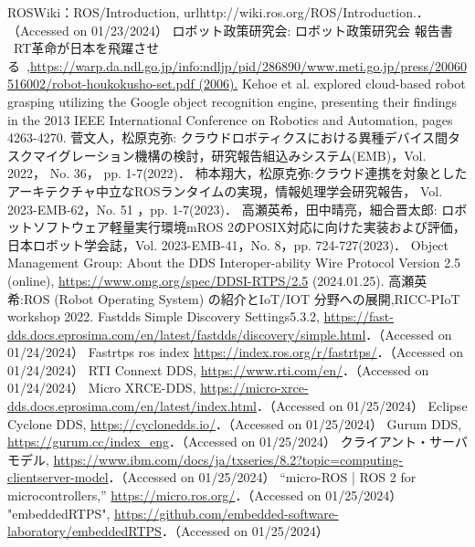 
\begin{thebibliography}{99}
 ROSWiki：ROS/Introduction, url{http://wiki.ros.org/ROS/Introduction.}．（Accessed on 01/23/2024）
 ロボット政策研究会: ロボット政策研究会 報告書 ~RT革命が日本を飛躍させる~,\url{https://warp.da.ndl.go.jp/info:ndljp/pid/286890/www.meti.go.jp/press/20060516002/robot-houkokusho-set.pdf (2006).}
 Kehoe et al. explored cloud-based robot grasping utilizing the Google object recognition engine, presenting their findings in the 2013 IEEE International Conference on Robotics and Automation, pages 4263-4270.
 菅文人，松原克弥: クラウドロボティクスにおける異種デバイス間タスクマイグレーション機構の検討，研究報告組込みシステム(EMB)，Vol. 2022， No. 36， pp. 1-7(2022)．
 柿本翔大，松原克弥:クラウド連携を対象としたアーキテクチャ中立なROSランタイムの実現，情報処理学会研究報告， Vol. 2023-EMB-62，No. 51 ，pp. 1-7(2023)．
 高瀬英希，田中晴亮，細合晋太郎: ロボットソフトウェア軽量実行環境mROS 2のPOSIX対応に向けた実装および評価，日本ロボット学会誌，Vol. 2023-EMB-41，No. 8，pp. 724-727(2023)．
 Object Management Group: About the DDS Interoper-ability Wire Protocol Version 2.5 (online), \url{https://www.omg.org/spec/DDSI-RTPS/2.5} (2024.01.25).
 高瀬英希:ROS (Robot Operating System) の紹介とIoT/IOT 分野への展開,RICC-PIoT workshop 2022.
 Fastdds Simple Discovery Settings5.3.2, \url{https://fast-dds.docs.eprosima.com/en/latest/fastdds/discovery/simple.html}．（Accessed on 01/24/2024）
 Fastrtps ros index \url{https://index.ros.org/r/fastrtps/}．（Accessed on 01/24/2024）
 RTI Connext DDS, \url{https://www.rti.com/en/}．（Accessed on 01/24/2024）
Micro XRCE-DDS, \url{https://micro-xrce-dds.docs.eprosima.com/en/latest/index.html}．（Accessed on 01/25/2024）
Eclipse Cyclone DDS, \url{https://cyclonedds.io/}．（Accessed on 01/25/2024）
Gurum DDS, \url{https://gurum.cc/index_eng}．（Accessed on 01/25/2024）
クライアント・サーバモデル, \url{https://www.ibm.com/docs/ja/txseries/8.2?topic=computing-clientserver-model}．（Accessed on 01/25/2024）
 “micro-ROS | ROS 2 for microcontrollers,” \url{https://micro.ros.org/}．（Accessed on 01/25/2024）
 "embeddedRTPS", \url{https://github.com/embedded-software-laboratory/embeddedRTPS}．（Accessed on 01/25/2024）

\end{thebibliography}
